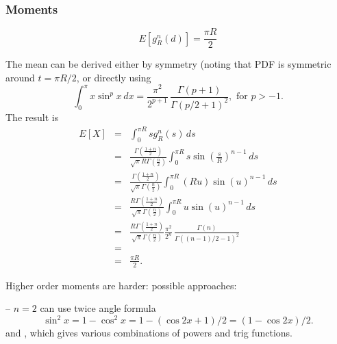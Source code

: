 \subsubsection{Moments}

\begin{equation}
E[g_{R}^{n}(d)]=\frac{\pi R}{2}
\end{equation}

The mean can be derived either by symmetry (noting that PDF is symmetric around
$t = \pi R/2$, or directly using \cite[3.821,1.(p.446)]{GandR}
\begin{equation}
  \label{eq:sin_x_x}
  \int_0^\pi x \sin^p x \, dx =
       \frac{\pi^2}{2^{p+1}} \, \frac{\Gamma(p+1)}{ \Gamma\left(p/2+1 \right)^2 }, \mbox{ for } p>-1.
\end{equation}
The result is 
\begin{eqnarray}
  \label{eq:mean_nsphere_geo}
 E[X] & = & \int_0^{\pi R} 
                    s g_{R}^{n}(s)
                   \, ds \nonumber \\
      & = & \frac{\Gamma\left(\frac{1+n}{2}\right) }
                        {\sqrt{\pi } R \Gamma\left(\frac{n}{2}\right)}
            \int_0^{\pi R} 
                    s  \sin \left( \frac{s}{R} \right)^{n-1}
                   \, ds \nonumber \\
      & = & \frac{\Gamma\left(\frac{1+n}{2}\right) }
                        {\sqrt{\pi } \Gamma\left(\frac{n}{2}\right)}
            \int_0^{\pi R} 
                    (R u)  \sin \left( u \right)^{n-1}
                   \, ds \nonumber \\
      & = & \frac{R \Gamma\left(\frac{1+n}{2}\right) }
                        {\sqrt{\pi } \Gamma\left(\frac{n}{2}\right)}
            \int_0^{\pi R} 
                    u \sin \left( u \right)^{n-1}
                   \, ds \nonumber \\
      & = & \frac{R \Gamma\left(\frac{1+n}{2}\right) }
                        {\sqrt{\pi } \Gamma\left(\frac{n}{2}\right)}
                \frac{\pi^2}{2^{n}} \, \frac{\Gamma(n)}{ \Gamma\left((n-1)/2-1 \right)^2 }
             \nonumber \\
       & = & \nonumber \\
       & = & \frac{\pi R}{2}.
\end{eqnarray}

Higher order moments are harder: possible approaches:

-- $n=2$ can use twice angle formula
\[
\sin^2 x = 1 - \cos^2 x = 1 - ( \cos 2 x +1)/2 = (1 - \cos 2x )/2 .
\]
and \cite[3.761 (p.421)]{GandR}, which gives various combinations
of powers and trig functions.

